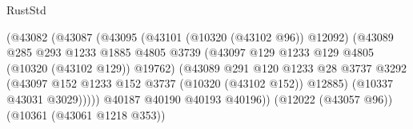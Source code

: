 \begin{lexlean}{RustStd}
\begin{coremodule}
                                                  (@43082
                                                    (@43087
                                                      (@43095
                                                        (@43101 (@10320 (@43102 @96)) @12092)
                                                        (@43089
                                                          @285
                                                          @293
                                                          @1233
                                                          @1885
                                                          @4805
                                                          @3739
                                                          (@43097
                                                            @129
                                                            @1233
                                                            @129
                                                            @4805
                                                            (@10320 (@43102 @129))
                                                            @19762)
                                                          (@43089
                                                            @291
                                                            @120
                                                            @1233
                                                            @28
                                                            @3737
                                                            @3292
                                                            (@43097
                                                              @152
                                                              @1233
                                                              @152
                                                              @3737
                                                              (@10320 (@43102 @152))
                                                              @12885)
                                                            (@10337 @43031 @3029)))))
                                                    @40187
                                                    @40190
                                                    @40193
                                                    @40196))
                                                (@12022 (@43057 @96))
                                                (@10361 (@43061 @1218 @353))

\end{coremodule}
\end{lexlean}
